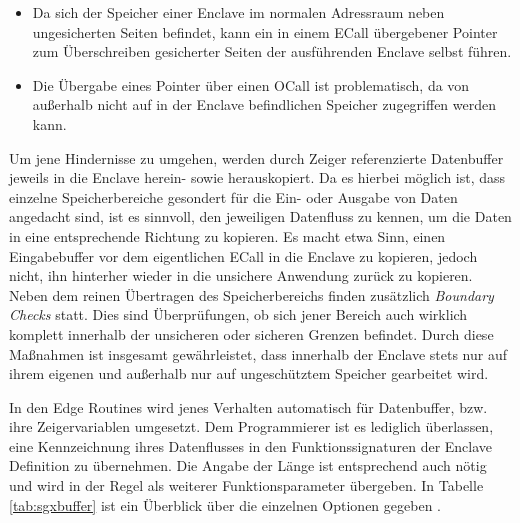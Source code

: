 \begin{itemize}
	\item Da sich der Speicher einer Enclave im normalen Adressraum neben ungesicherten Seiten befindet, kann ein in einem \ac{ECall} übergebener Pointer zum Überschreiben gesicherter Seiten der ausführenden Enclave selbst führen.
	\item Die Übergabe eines Pointer über einen \ac{OCall} ist problematisch, da von außerhalb nicht auf in der Enclave befindlichen Speicher zugegriffen werden kann.
\end{itemize}

Um jene Hindernisse zu umgehen, werden durch Zeiger referenzierte Datenbuffer jeweils in die Enclave herein- sowie herauskopiert. Da es hierbei möglich ist, dass einzelne Speicherbereiche gesondert für die Ein- oder Ausgabe von Daten angedacht sind, ist es sinnvoll, den jeweiligen Datenfluss zu kennen, um die Daten in eine entsprechende Richtung zu kopieren. Es macht etwa Sinn, einen Eingabebuffer vor dem eigentlichen \ac{ECall} in die Enclave zu kopieren, jedoch nicht, ihn hinterher wieder in die unsichere Anwendung  zurück zu kopieren. Neben dem reinen Übertragen des Speicherbereichs finden zusätzlich \textit{Boundary Checks} statt. Dies sind Überprüfungen, ob sich jener Bereich auch wirklich komplett innerhalb der unsicheren oder sicheren Grenzen befindet. Durch diese Maßnahmen ist insgesamt gewährleistet, dass innerhalb der Enclave stets nur auf ihrem eigenen und außerhalb nur auf ungeschütztem Speicher gearbeitet wird.

In den Edge Routines wird jenes Verhalten automatisch für Datenbuffer, bzw. ihre Zeigervariablen umgesetzt. Dem Programmierer ist es lediglich überlassen, eine Kennzeichnung ihres Datenflusses in den Funktionssignaturen der Enclave Definition zu übernehmen. Die Angabe der Länge ist entsprechend auch nötig und wird in der Regel als weiterer Funktionsparameter übergeben. In Tabelle \ref{tab:sgxbuffer} ist ein Überblick über die einzelnen Optionen gegeben \cite{LinuxGuide}.

